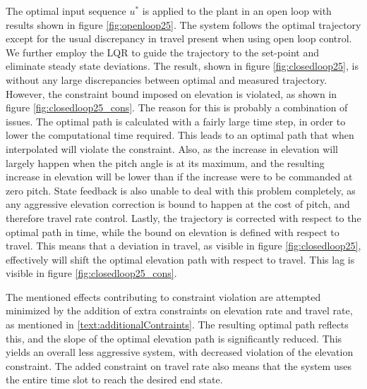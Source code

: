 The optimal input sequence $u^*$ is applied to the plant in an open loop with results shown in figure \ref{fig:openloop25}. The system follows the optimal trajectory except for the usual discrepancy in travel present when using open loop control. We further employ the LQR to guide the trajectory to the set-point and eliminate steady state deviations. The result, shown in figure \ref{fig:closedloop25}, is without any large discrepancies between optimal and measured trajectory. However, the constraint bound imposed on elevation is violated, as shown in figure \ref{fig:closedloop25_cons}. The reason for this is probably a combination of issues. The optimal path is calculated with a fairly large time step, in order to lower the computational time required. This leads to an optimal path that when interpolated will violate the constraint. Also, as the increase in elevation will largely happen when the pitch angle is at its maximum, and the resulting increase in elevation will be lower than if the increase were to be commanded at zero pitch. State feedback is also unable to deal with this problem completely, as any aggressive elevation correction is bound to happen at the cost of pitch, and therefore travel rate control. Lastly, the trajectory is corrected with respect to the optimal path in time, while the bound on elevation is defined with respect to travel. This means that a deviation in travel, as visible in figure \ref{fig:closedloop25}, effectively will shift the optimal elevation path with respect to travel. This lag is visible in figure \ref{fig:closedloop25_cons}.

The mentioned effects contributing to constraint violation are attempted minimized by the addition of extra constraints on elevation rate and travel rate, as mentioned in \ref{text:additionalContraints}. The resulting optimal path reflects this, and the slope of the optimal elevation path is significantly reduced. This yields an overall less aggressive system, with decreased violation of the elevation constraint. The added constraint on travel rate also means that the system uses the entire time slot to reach the desired end state.

